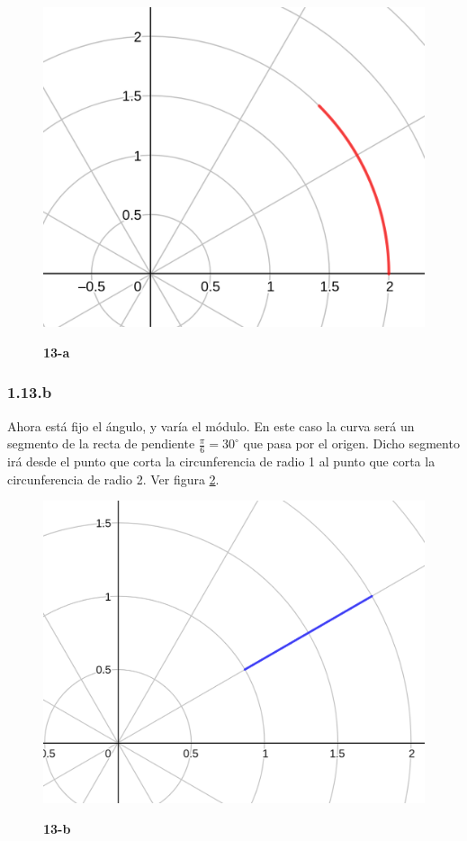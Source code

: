 \documentclass{article}
\begin{document}
\begin{figure}[ht]
\caption{\textbf{13-a}}
\includegraphics[scale=1.4]{img/ejercicios/1/13-a.png} 
\centering
\label{fig:1-13-a}
\end{figure}

\subsubsection*{1.13.b}
\label{subsubsec:1.13.b}

Ahora está fijo el ángulo, y varía el módulo. En este caso la curva será un segmento de la recta de pendiente $\frac{\pi}{6}= 30^{\circ}$ que pasa por el origen. Dicho segmento irá desde el punto que corta la circunferencia de radio 1 al punto que corta la circunferencia de radio 2. Ver figura \ref{fig:1-13-b}.

\begin{figure}[ht]
\caption{\textbf{13-b}}
\includegraphics[scale=2.35]{img/ejercicios/1/13-b.png} 
\centering
\label{fig:1-13-b}
\end{figure}
\end{document}
